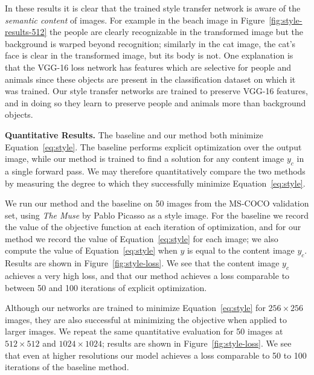 \documentclass[runningheads]{llncs}
\begin{document}
In these results it is clear that the trained style transfer network is aware of the
\emph{semantic content} of images. For example in
the beach image in Figure~\ref{fig:style-results-512} the people are clearly recognizable in the
transformed image but the background is warped beyond recognition; similarly in the cat image,
the cat's face is clear in the transformed image, but its body is not. One
explanation is that the VGG-16 loss network has features which are selective for people and animals
since these objects are present in the classification dataset on which it was trained. Our style
transfer networks are trained to preserve VGG-16 features, and in doing so they learn to preserve
people and animals more than background objects.

\vspace{1mm}
\noindent \textbf{Quantitative Results.}
The baseline and our method both minimize Equation~\ref{eq:style}. The baseline performs explicit
optimization over the output image, while our method is trained to find a solution for any
content image $y_c$ in a single forward pass. We may therefore quantitatively compare the two
methods by measuring the degree to which they successfully minimize Equation~\ref{eq:style}.

We run our method and the baseline on 50 images from the MS-COCO validation set, using
\emph{The Muse} by Pablo Picasso as a style image. For the baseline we record the value of the
objective function at each iteration of optimization, and for our method we record the value
of Equation~\ref{eq:style} for each image; we also compute the value of Equation~\ref{eq:style}
when $y$ is equal to the content image $y_c$. Results are shown in Figure~\ref{fig:style-loss}.
We see that the content image $y_c$ achieves a very high loss, and that our method achieves a
loss comparable to between 50 and 100 iterations of explicit optimization.

Although our networks are trained to minimize Equation~\ref{eq:style} for $256\times256$ images,
they are also successful at minimizing the objective when applied to larger images. We repeat the
same quantitative evaluation for 50 images at $512\times512$ and $1024\times1024$; results are shown
in Figure~\ref{fig:style-loss}. We see that even at higher resolutions our model achieves a loss
comparable to 50 to 100 iterations of the baseline method.
\end{document}
